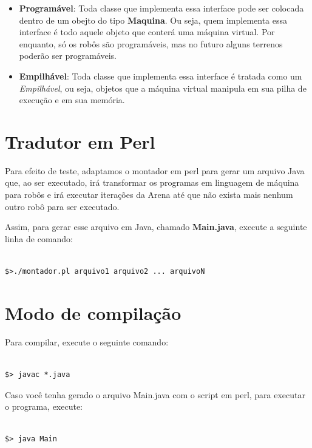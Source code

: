 \documentclass[11pt]{article}
\begin{document}
\begin{itemize}

	\item \textbf{Programável}: Toda classe que implementa essa interface pode ser colocada dentro
	de um obejto do tipo \textbf{\color{red}Maquina}. Ou seja, quem implementa essa interface é
	todo aquele objeto que conterá uma máquina virtual. Por enquanto, só os robôs são programáveis,
	mas no futuro alguns terrenos poderão ser programáveis.

	\item \textbf{Empilhável}: Toda classe que implementa essa interface é tratada como um \emph{Empilhável},
	ou seja, objetos que a máquina virtual manipula em sua pilha de execução e em sua memória.

\end{itemize}


\section{Tradutor em Perl}

Para efeito de teste, adaptamos o montador em perl para gerar um arquivo Java que, ao ser executado, irá transformar os programas em linguagem de máquina para robôs e irá executar iterações da Arena até que não exista mais nenhum outro robô para ser executado.

Assim, para gerar esse arquivo em Java, chamado \textbf{\color{red}Main.java}, execute a seguinte linha de comando:
\begin{verbatim}

$>./montador.pl arquivo1 arquivo2 ... arquivoN

\end{verbatim}

\section{Modo de compilação}

Para compilar, execute o seguinte comando:

\begin{verbatim}

$> javac *.java

\end{verbatim}

Caso você tenha gerado o arquivo Main.java com o script em perl, para executar o programa, execute:

\begin{verbatim}

$> java Main

\end{verbatim}
\end{document}
